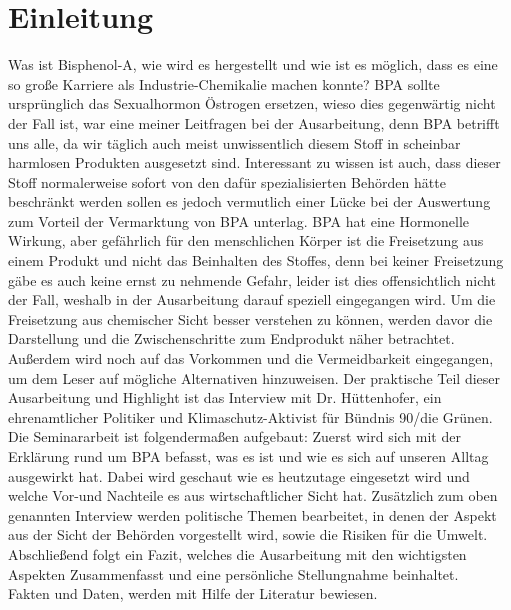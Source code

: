 \section{Einleitung}
Was ist Bisphenol-A, wie wird es hergestellt und wie ist es möglich, dass es eine so große Karriere als Industrie-Chemikalie machen konnte? BPA sollte ursprünglich das Sexualhormon \glqq Östrogen\grqq{} ersetzen, wieso dies gegenwärtig nicht der Fall ist, war eine meiner Leitfragen bei der Ausarbeitung, denn BPA betrifft uns alle, da wir täglich auch meist unwissentlich diesem Stoff in scheinbar \glqq harmlosen\grqq{} Produkten ausgesetzt sind. Interessant zu wissen ist auch, dass dieser Stoff normalerweise sofort von den dafür spezialisierten Behörden hätte beschränkt werden sollen es jedoch vermutlich einer Lücke bei der Auswertung zum Vorteil der Vermarktung von BPA unterlag. BPA hat eine Hormonelle Wirkung, aber gefährlich für den menschlichen Körper ist die Freisetzung aus einem Produkt und nicht das Beinhalten des Stoffes, denn bei keiner Freisetzung gäbe es auch keine ernst zu nehmende Gefahr, leider ist dies offensichtlich nicht der Fall, weshalb in der Ausarbeitung darauf speziell eingegangen wird. Um die Freisetzung aus chemischer Sicht besser verstehen zu können, werden davor die Darstellung und die Zwischenschritte zum Endprodukt näher betrachtet. Außerdem wird noch auf das Vorkommen und die Vermeidbarkeit eingegangen, um dem Leser auf mögliche Alternativen hinzuweisen. Der praktische Teil dieser Ausarbeitung und \glqq Highlight\grqq{} ist das Interview mit Dr. Hüttenhofer, ein ehrenamtlicher Politiker und Klimaschutz-Aktivist für Bündnis 90/die Grünen.
\\Die Seminararbeit ist folgendermaßen aufgebaut: Zuerst wird sich mit der Erklärung rund um BPA befasst, was es ist und wie es sich auf unseren Alltag ausgewirkt hat. Dabei wird geschaut wie es heutzutage eingesetzt wird und welche Vor-und Nachteile es aus wirtschaftlicher Sicht hat. Zusätzlich zum oben genannten Interview werden politische Themen bearbeitet, in denen der Aspekt aus der Sicht der Behörden vorgestellt wird, sowie die Risiken für die Umwelt. Abschließend folgt ein Fazit, welches die Ausarbeitung mit den wichtigsten Aspekten Zusammenfasst und eine persönliche Stellungnahme beinhaltet.
\\Fakten und Daten, werden mit Hilfe der Literatur bewiesen.
